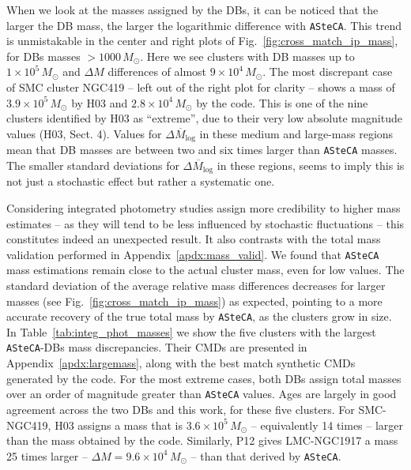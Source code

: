 \documentclass[referee]{aa}
\begin{document}
When we look at the masses assigned by the DBs, it can be noticed that the
larger the DB mass, the larger the logarithmic difference with \texttt{ASteCA}.
This trend is unmistakable in the center and right plots of
Fig.~\ref{fig:cross_match_ip_mass}, for DBs masses ${>}1000\,M_{\odot}$.
%
Here we see clusters with DB masses up to $1{\times}10^5\,M_{\odot}$
and $\Delta M$ differences of almost $9{\times}10^4\,M_{\odot}$.
The most discrepant case of SMC cluster NGC419 -- left out of the right
plot for clarity -- shows a mass of $3.9{\times}10^5\,M_{\odot}$ by H03
and $2.8{\times}10^4\,M_{\odot}$ by the code. This is one of the
nine clusters identified by H03 as ``extreme'', due to their very low absolute
magnitude values (H03, Sect. 4).
Values for $\overline{\Delta M_{\log}}$ in these medium and large-mass regions
mean that DB masses are between two and six times larger than \texttt{ASteCA}
masses. The smaller standard deviations for $\overline{\Delta M_{\log}}$ in
these regions, seems to imply this is not just a stochastic effect but rather a
systematic one.

Considering integrated photometry studies assign more credibility to higher
mass estimates -- as they will tend to be less influenced by stochastic
fluctuations -- this constitutes indeed an unexpected result.
%
It also contrasts with the total mass validation performed in
Appendix~\ref{apdx:mass_valid}. We found that \texttt{ASteCA} mass estimations
remain close to the actual cluster mass, even for low values. The standard
deviation of the average relative mass differences decreases for larger
masses (see Fig.~\ref{fig:cross_match_ip_mass}) as expected, pointing to a more
accurate recovery of the true total mass by \texttt{ASteCA}, as the clusters
grow in size.\\

%
In Table~\ref{tab:integ_phot_masses} we show the five clusters with the largest
\texttt{ASteCA}-DBs mass discrepancies. Their CMDs are presented in
Appendix~\ref{apdx:largemass}, along with the best match synthetic CMDs
generated by the code.
For the most extreme cases, both DBs assign total masses over an order
of magnitude greater than \texttt{ASteCA} values. Ages are largely in good
agreement across the two DBs and this work, for these five clusters.
%
For SMC-NGC419, H03 assigns a mass that is $3.6{\times}10^5\,M_{\odot}$ --
equivalently 14 times -- larger than the mass obtained by the code. Similarly,
P12 gives LMC-NGC1917 a mass 25 times larger -- $\Delta M{=}9.6{\times}10^4\,M_
{\odot}$ -- than that derived by \texttt{ASteCA}.
\end{document}
